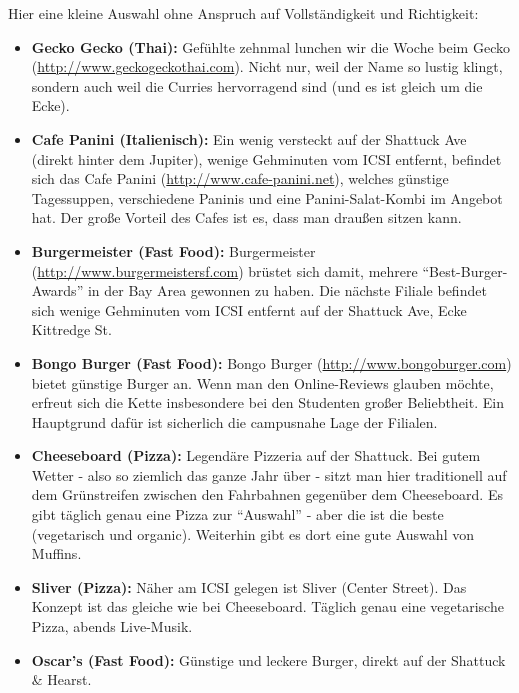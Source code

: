 \documentclass[a4paper]{scrreprt}
\begin{document}
Hier eine kleine Auswahl ohne Anspruch auf Vollständigkeit und Richtigkeit: %

\begin{itemize}
  \item \textbf{Gecko Gecko (Thai):} Gefühlte zehnmal lunchen wir die Woche beim Gecko (\url{http://www.geckogeckothai.com}). Nicht nur, weil der Name so lustig klingt, sondern auch weil die Curries hervorragend sind (und es ist gleich um die Ecke).

	\item \textbf{Cafe Panini (Italienisch):} Ein wenig versteckt auf der Shattuck Ave (direkt hinter dem Jupiter), wenige Gehminuten vom ICSI entfernt, befindet sich das Cafe Panini (\url{http://www.cafe-panini.net}), welches günstige Tagessuppen, verschiedene Paninis und eine Panini-Salat-Kombi im Angebot hat. Der große Vorteil des Cafes ist es, dass man draußen sitzen kann.

  \item \textbf{Burgermeister (Fast Food):} Burgermeister (\url{http://www.burgermeistersf.com}) brüstet sich damit, mehrere	 "`Best-Burger-Awards"' in der Bay Area gewonnen zu haben. Die nächste Filiale befindet sich wenige Gehminuten vom ICSI entfernt auf der Shattuck Ave, Ecke Kittredge St.

  \item \textbf{Bongo Burger (Fast Food):} Bongo Burger (\url{http://www.bongoburger.com}) bietet günstige Burger an. Wenn man den Online-Reviews glauben möchte, erfreut sich die Kette insbesondere bei den Studenten großer Beliebtheit. Ein Hauptgrund dafür ist sicherlich die campusnahe Lage der Filialen.

	\item \textbf{Cheeseboard (Pizza):} Legendäre Pizzeria auf der Shattuck. Bei gutem Wetter - also so ziemlich das ganze Jahr über - sitzt man hier traditionell auf dem Grünstreifen zwischen den Fahrbahnen gegenüber dem Cheeseboard. Es gibt täglich genau eine Pizza zur "`Auswahl"' - aber die ist die beste (vegetarisch und organic). Weiterhin gibt es dort eine gute Auswahl von Muffins.

	\item \textbf{Sliver (Pizza):} Näher am ICSI gelegen ist Sliver (Center Street). Das Konzept ist das gleiche wie bei Cheeseboard. Täglich genau eine vegetarische Pizza, abends Live-Musik.

  \item \textbf{Oscar's (Fast Food):} Günstige und leckere Burger, direkt auf der Shattuck \& Hearst.


\end{itemize}
\end{document}
